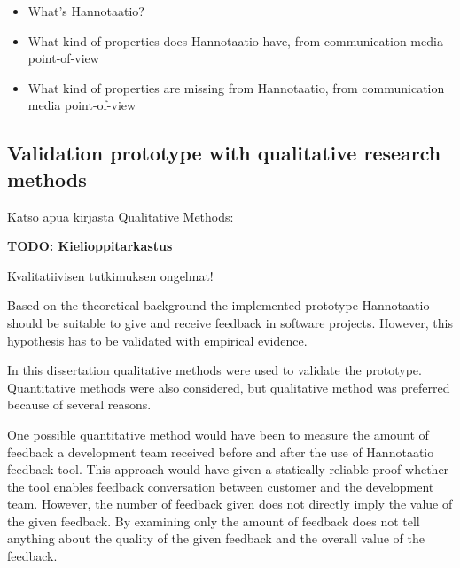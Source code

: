 \documentclass[english,12pt,a4paper,pdftex]{article}
\begin{document}
\begin{itemize}
\item What's Hannotaatio?
\item What kind of properties does Hannotaatio have, from communication media point-of-view
\item What kind of properties are missing from Hannotaatio, from communication media point-of-view
\end{itemize}

\subsection{Validation prototype with qualitative research methods}

Katso apua kirjasta Qualitative Methods: \citep{gummesson1999}

\textbf{TODO: Kielioppitarkastus}

Kvalitatiivisen tutkimuksen ongelmat!

Based on the theoretical background the implemented prototype Hannotaatio should be suitable to give and receive feedback in software projects. However, this hypothesis has to be validated with empirical evidence. 

In this dissertation qualitative methods were used to validate the prototype. Quantitative methods were also considered, but qualitative method was preferred because of several reasons.

One possible quantitative method would have been to measure the amount of feedback a development team received before and after the use of Hannotaatio feedback tool. This approach would have given a statically reliable proof whether the tool enables feedback conversation between customer and the development team. However, the number of feedback given does not directly imply the value of the given feedback. By examining only the amount of feedback does not tell anything about the quality of the given feedback and the overall value of the feedback. 
\end{document}
